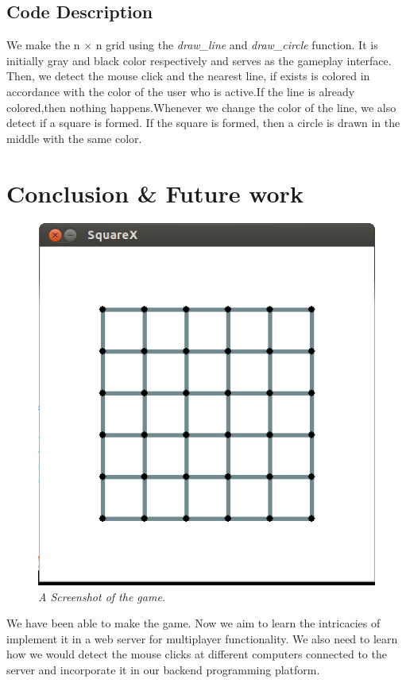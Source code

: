 \documentclass[12pt, a4paper]{report}
\begin{document}
\section{Code Description}
We make the n $\times$ n grid using the \textit{draw\_line} and \textit{draw\_circle} function. It is initially gray and black color respectively and serves as the gameplay interface. Then, we detect the mouse click and the nearest line, if exists is colored in accordance with the color of the user who is active.If the line is already colored,then nothing happens.Whenever we change the color of the line, we also detect if a square is formed. If  the square is formed, then a circle is drawn in the middle with the same color.

\chapter{Conclusion \& Future work}

\begin{figure}[!t]
\centering
\includegraphics[width=5in]{screenshot.png}
\caption{\small \sl A Screenshot of the game.}
\label{fig_FSM}
\end{figure}

We have been able to make the game. Now we aim to learn the intricacies of implement it in a web server for multiplayer functionality. We also need to learn how we would detect the mouse clicks at different computers connected to the server and incorporate it in our backend programming platform.
\end{document}
